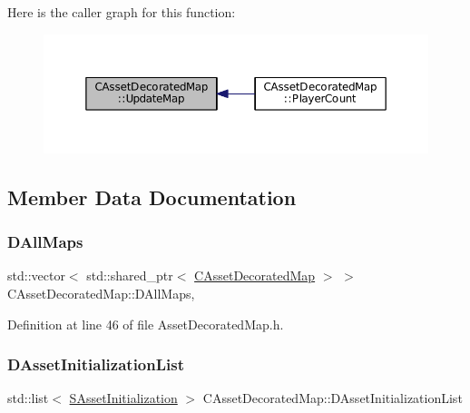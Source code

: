 Here is the caller graph for this function\+:
\nopagebreak
\begin{figure}[H]
\begin{center}
\leavevmode
\includegraphics[width=350pt]{classCAssetDecoratedMap_a7b594b6bef2eed8bbb0e4e4e6b855903_icgraph}
\end{center}
\end{figure}


\subsection{Member Data Documentation}
\hypertarget{classCAssetDecoratedMap_a32cdd80c7e9d31d8ce5397dd6d61dc4b}{}\label{classCAssetDecoratedMap_a32cdd80c7e9d31d8ce5397dd6d61dc4b} 
\subsubsection{\texorpdfstring{D\+All\+Maps}{DAllMaps}}
{\footnotesize\ttfamily std\+::vector$<$ std\+::shared\+\_\+ptr$<$ \hyperlink{classCAssetDecoratedMap}{C\+Asset\+Decorated\+Map} $>$ $>$ C\+Asset\+Decorated\+Map\+::\+D\+All\+Maps\hspace{0.3cm}{\ttfamily [static]}, {\ttfamily [protected]}}



Definition at line 46 of file Asset\+Decorated\+Map.\+h.

\hypertarget{classCAssetDecoratedMap_a2b7bf2e9a19a9173093cef32048608c2}{}\label{classCAssetDecoratedMap_a2b7bf2e9a19a9173093cef32048608c2} 
\subsubsection{\texorpdfstring{D\+Asset\+Initialization\+List}{DAssetInitializationList}}
{\footnotesize\ttfamily std\+::list$<$ \hyperlink{structCAssetDecoratedMap_1_1SAssetInitialization}{S\+Asset\+Initialization} $>$ C\+Asset\+Decorated\+Map\+::\+D\+Asset\+Initialization\+List\hspace{0.3cm}{\ttfamily [protected]}}




